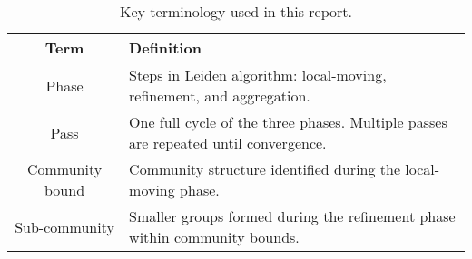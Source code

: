 \begin{table}[hbtp]
  \centering
  \caption{Key terminology used in this report.}
  \label{tab:terminology}
  \begin{tabular}{|c|p{39ex}|}
    \toprule
    \textbf{Term} &
    \textbf{Definition} \\
    \midrule
    Phase & Steps in Leiden algorithm: local-moving, refinement, and aggregation. \\ \hline
    Pass & One full cycle of the three phases. Multiple passes are repeated until convergence. \\ \hline
    Community bound & Community structure identified during the local-moving phase. \\ \hline
    Sub-community & Smaller groups formed during the refinement phase within community bounds. \\ \hline
  \bottomrule
  \end{tabular}
\end{table}
